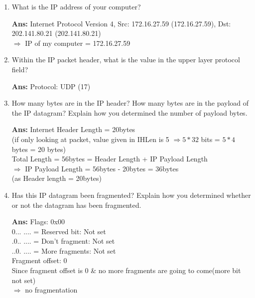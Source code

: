 \documentclass[a4,11pt]{article}
\newenvironment{que}
{ \color{ForestGreen}
  \begin{question}
}
{ \end{question} }
\newenvironment{sol}
{ \color{Black}
  \begin{solution}
}
{ \end{solution} }
\begin{document}
  \begin{enumerate}
   \item
    \begin{que}
      What is the IP address of your computer?
    \end{que}
    
    \begin{sol}
    \textbf{Ans:}  Internet Protocol Version 4, Src: 172.16.27.59 (172.16.27.59), Dst: 202.141.80.21 (202.141.80.21) \\
	$\Rightarrow$  IP of my computer = 172.16.27.59    
    \end{sol}

   
    \item
      \begin{que}
	Within the IP packet header, what is the value in the upper layer protocol field?
      \end{que}
      
      \begin{sol}
      \textbf{Ans:} 	Protocol: UDP (17)
      \end{sol}

      
    \item
      \begin{que}
	How many bytes are in the IP header? How many bytes are in the payload of the IP datagram? 
	Explain how you determined the number of payload bytes.
      \end{que}
      
      \begin{sol}
	 \textbf{Ans:} Internet Header Length = 20bytes \\
	(if only looking at packet, value given in IHLen is 5 $\Rightarrow 5*32$ bits = $5*4$bytes = 20 bytes) \\
	
	Total Length = 56bytes = Header Length + IP Payload Length \\
	$\Rightarrow$ IP Payload Length = 56bytes - 20bytes = 36bytes \\
	(as Header length = 20bytes)
      \end{sol}

     \item
      \begin{que}
	 Has this IP datagram been fragmented? Explain how you determined whether or not the datagram has been fragmented.
      \end{que}
      
      \begin{sol}
	 \textbf{Ans:}   Flags: 0x00 \\
	  0... .... = Reserved bit:   Not set \\
	  .0.. .... = Don't fragment: Not set \\
	  ..0. .... = More fragments: Not set \\
	  Fragment offset: 0 \\
	  Since fragment offset is 0 \& no more fragments are going to come(more bit not set) \\
	  $\Rightarrow$ no fragmentation
      \end{sol}


\end{enumerate}
\end{document}
